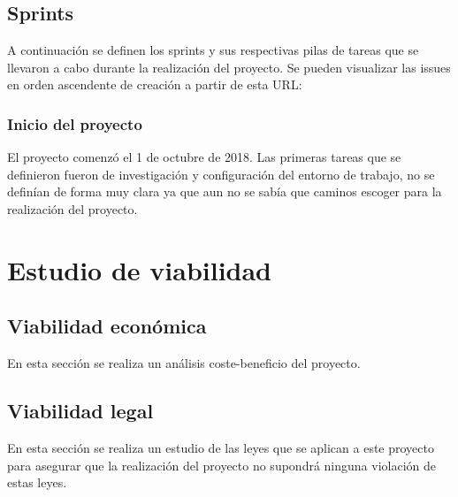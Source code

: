 \subsection{Sprints}
A continuación se definen los sprints y sus respectivas pilas de tareas que se llevaron a cabo durante la realización del proyecto. 
Se pueden visualizar las issues en orden ascendente de creación a partir de esta URL:

\subsubsection{Inicio del proyecto}
El proyecto comenzó el 1 de octubre de 2018. Las primeras tareas que se definieron fueron de investigación y configuración del entorno de trabajo, no se definían de forma muy clara ya que aun no se sabía que caminos escoger para la realización del proyecto.

\section{Estudio de viabilidad}
\subsection{Viabilidad económica}
En esta sección se realiza un análisis coste-beneficio del proyecto.
\subsection{Viabilidad legal}
En esta sección se realiza un estudio de las leyes que se aplican a este proyecto para asegurar que la realización del proyecto no supondrá ninguna violación de estas leyes. 



